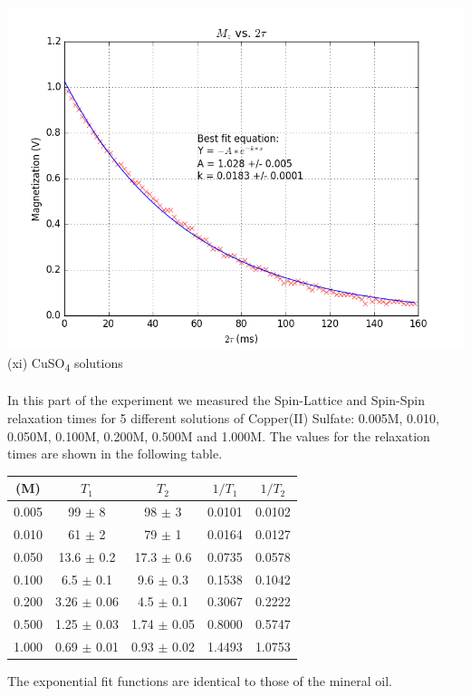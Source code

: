 \documentclass{article}
\begin{document}
{\begin{multicols}{2}
\label{fig:18}
\includegraphics[width=\linewidth]{pic-for-report/mineral-water-T2-MG.png}
\label{fig:19}
\justify
(xi) CuSO\textsubscript{4} solutions \\
\\
In this part of the experiment we measured the Spin-Lattice and Spin-Spin 
relaxation times for 5 different solutions of Copper(II) Sulfate: 0.005M, 
0.010, 0.050M, 0.100M, 0.200M, 0.500M and 1.000M. The values for the relaxation 
times are shown in the following table.
\begin{tabular}{|c|c|c|c|c|}
\hline
 (M) & $T_1$ & $T_2$ & $1/T_1$ & $1/T_2$ \\ \hline
0.005 & 99 $\pm$ 8 & 98 $\pm$ 3 & 0.0101 & 0.0102 \\ \hline
0.010 & 61 $\pm$ 2 & 79 $\pm$ 1 & 0.0164 & 0.0127 \\ \hline
0.050 & 13.6 $\pm$ 0.2 & 17.3 $\pm$ 0.6 & 0.0735 & 0.0578 \\ \hline
0.100 & 6.5 $\pm$ 0.1 & 9.6 $\pm$ 0.3 & 0.1538 & 0.1042 \\ \hline
0.200 & 3.26 $\pm$ 0.06 & 4.5 $\pm$ 0.1 & 0.3067 & 0.2222 \\ \hline
0.500 & 1.25 $\pm$ 0.03 & 1.74 $\pm$ 0.05 & 0.8000 & 0.5747 \\ \hline
1.000 & 0.69 $\pm$ 0.01 & 0.93 $\pm$ 0.02 & 1.4493 & 1.0753 \\ \hline
\end{tabular}
The exponential fit functions are identical to those of the mineral oil. \\

\end{multicols}}
\end{document}
